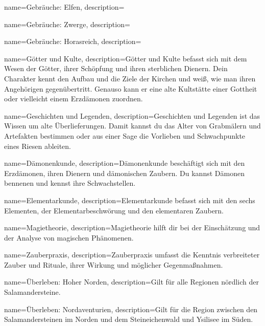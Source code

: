{
    name={Gebräuche: Elfen},
    description={}
}


{
    name={Gebräuche: Zwerge},
    description={}
}


{
    name={Gebräuche: Horasreich},
    description={}
}


{
    name={Götter und Kulte},
    description={Götter und Kulte befasst sich mit dem Wesen der Götter, ihrer Schöpfung und ihren sterblichen Dienern. Dein Charakter kennt den Aufbau und die Ziele der Kirchen und weiß, wie man ihren Angehörigen gegenübertritt. Genauso kann er eine alte Kultstätte einer Gottheit oder vielleicht einem Erzdämonen zuordnen.}
}


{
    name={Geschichten und Legenden},
    description={Geschichten und Legenden ist das Wissen um alte Überlieferungen. Damit kannst du das Alter von Grabmälern und Artefakten bestimmen oder aus einer Sage die Vorlieben und Schwachpunkte eines Riesen ableiten.}
}


{
    name={Dämonenkunde},
    description={Dämonenkunde beschäftigt sich mit den Erzdämonen, ihren Dienern und dämonischen Zaubern. Du kannst Dämonen bennenen und kennst ihre Schwachstellen.}
}


{
    name={Elementarkunde},
    description={Elementarkunde befasst sich mit den sechs Elementen, der Elementarbeschwörung und den elementaren Zaubern.}
}


{
    name={Magietheorie},
    description={Magietheorie hilft dir bei der Einschätzung und der Analyse von magischen Phänomenen.}
}


{
    name={Zauberpraxis},
    description={Zauberpraxis umfasst die Kenntnis verbreiteter Zauber und Rituale, ihrer Wirkung und möglicher Gegenmaßnahmen.}
}


{
    name={Überleben: Hoher Norden},
    description={Gilt für alle Regionen nördlich der Salamandersteine.}
}


{
    name={Überleben: Nordaventurien},
    description={Gilt für die Region zwischen den Salamandersteinen im Norden und dem Steineichenwald und Ysilisee im Süden.}
}


